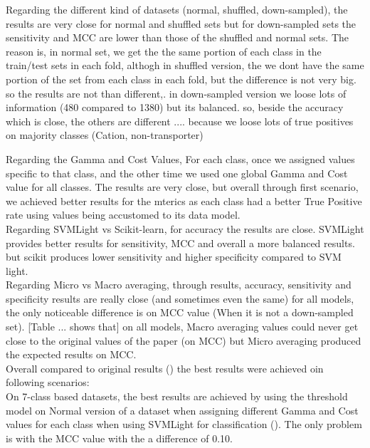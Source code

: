         Regarding the different kind of datasets (normal, shuffled, down-sampled), the results are very close for normal and shuffled 
        sets but for down-sampled sets the sensitivity and MCC are lower than those of the shuffled and normal sets. The reason is, 
        in normal set, we get the the same portion of each class in the train/test sets in each fold, althogh in shuffled version, the 
        we dont have the same portion of the set from each class in each fold, but the difference is not very big. so the results are not 
        than different,.  in down-sampled version we loose lots of information (480 compared to 1380) but its balanced. so, beside 
        the accuracy which is close, the others are different .... because we loose lots of true positives on majority classes 
        (Cation, non-transporter)


        Regarding the Gamma and Cost Values, For each class, once we assigned values specific to that class, 
        and the other time we used one global Gamma and Cost value for all classes. The results are very close, but overall
        through first scenario, we achieved better results for the mterics as each class had a better True Positive rate using 
        values being accustomed to its data model.\\

        Regarding SVMLight vs Scikit-learn, for accuracy the results are close. SVMLight provides better results for sensitivity, 
        MCC and overall a more balanced results. but scikit produces lower sensitivity and higher specificity compared to SVM light.\\

        Regarding Micro vs Macro averaging, through results, accuracy, sensitivity and 
        specificity results are really close (and sometimes even the same) for all models, the only noticeable 
        difference is on MCC value (When it is not a down-sampled set). 
        [Table ... shows that] on all models, Macro averaging values could never get close to the 
        original values of the paper (on MCC) but Micro averaging produced the expected results on MCC.\\

        Overall compared to original results () the best results were achieved oin following scenarios:\\

        On 7-class based datasets, the best results are achieved by using the threshold model on Normal version of a dataset when 
        assigning different Gamma and Cost values for each class when using SVMLight for classification 
        (). 
        The only problem is with the MCC value with the a difference of 0.10.

